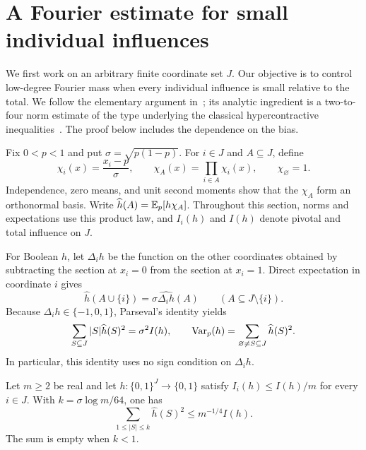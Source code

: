 \section{A Fourier estimate for small individual influences}
\label{sec:fourier}

We first work on an arbitrary finite coordinate set $J$. Our objective
is to control low-degree Fourier mass when every individual influence
is small relative to the total. We follow the elementary argument
in~\cite[Lemma~2.1]{Graph2026}; its analytic ingredient is a
two-to-four norm estimate of the type underlying the classical
hypercontractive inequalities~\cite{Bonami70,Beckner75}.
The proof below includes the dependence on the bias.

Fix $0<p<1$ and put $\sigma=\sqrt{p(1-p)}$. For $i\in J$ and
$A\subseteq J$, define
\[
 \chi_i(x)=\frac{x_i-p}{\sigma},\qquad
 \chi_A(x)=\prod_{i\in A}\chi_i(x),\qquad \chi_\varnothing=1.
\]
Independence, zero means, and unit second moments show that the
$\chi_A$ form an orthonormal basis. Write
$\widehat h(A)=\mathbb E_p[h\chi_A]$.
Throughout this section, norms and expectations use this product law,
and $I_i(h)$ and $I(h)$ denote pivotal and total influence on $J$.

For Boolean $h$, let $\Delta_i h$ be the function on the other
coordinates obtained by subtracting the section at $x_i=0$ from the
section at $x_i=1$. Direct expectation in coordinate $i$ gives
\[
 \widehat h(A\cup\{i\})=
 \sigma\widehat{\Delta_i h}(A)\qquad(A\subseteq J\setminus\{i\}).
\]
Because $\Delta_i h\in\{-1,0,1\}$, Parseval's identity yields
\begin{equation}\label{eq:parseval}
 \sum_{S\subseteq J}|S|\widehat h(S)^2=\sigma^2 I(h),
 \qquad
 \operatorname{Var}_p(h)=\sum_{\varnothing\ne S\subseteq J}\widehat h(S)^2.
\end{equation}
In particular, this identity uses no sign condition on $\Delta_i h$.

\begin{lemma}\label{lem:low}
Let $m\ge2$ be real and let $h:\{0,1\}^J\to\{0,1\}$ satisfy
$I_i(h)\le I(h)/m$ for every $i\in J$. With
$k=\sigma\log m/64$, one has
\begin{equation}\label{eq:low}
 \sum_{1\le |S|\le k}\widehat h(S)^2\le m^{-1/4}I(h).
\end{equation}
The sum is empty when $k<1$.
\end{lemma}

